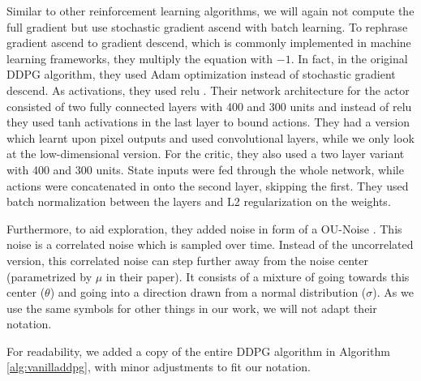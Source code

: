 \documentclass[hyperref,final,beleg]{cgvpub}
\begin{document}
Similar to other reinforcement learning algorithms, we will again not compute the full gradient but use stochastic gradient ascend with batch learning. To rephrase gradient ascend to gradient descend, which is commonly implemented in machine learning frameworks, they multiply the equation with $-1$. In fact, in the original \ac{DDPG} algorithm, they used Adam \cite{kingmaAdamMethodStochastic2017} optimization instead of stochastic gradient descend. As activations, they used relu \cite{agarapDeepLearningUsing2019}. Their network architecture for the actor consisted of two fully connected layers with 400 and 300 units and instead of relu they used tanh activations in the last layer to bound actions. They had a version which learnt upon pixel outputs and used convolutional layers, while we only look at the low-dimensional version. For the critic, they also used a two layer variant with 400 and 300 units. State inputs were fed through the whole network, while actions were concatenated in onto the second layer, skipping the first. They used batch normalization between the layers and L2 regularization on the weights.

Furthermore, to aid exploration, they added noise in form of a \ac{OU-Noise} \cite{uhlenbeckTheoryBrownianMotion1930}. This noise is a correlated noise which is sampled over time. Instead of the uncorrelated version, this correlated noise can step further away from the noise center (parametrized by $\mu$ in their paper). It consists of a mixture of going towards this center ($\theta$) and going into a direction drawn from a normal distribution ($\sigma$). As we use the same symbols for other things in our work, we will not adapt their notation. 


For readability, we added a copy of the entire \ac{DDPG} algorithm in Algorithm \ref{alg:vanilladdpg}, with minor adjustments to fit our notation.
\end{document}
